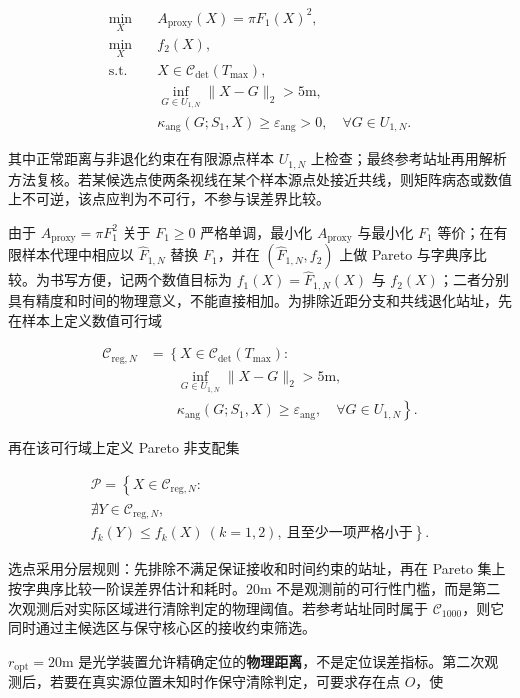 \[
\begin{aligned}
\min_{X}\quad
& A_{\mathrm{proxy}}(X)=\pi F_1(X)^2,\\
\min_{X}\quad
& f_2(X),\\
\text{s.t.}\quad
& X\in\mathcal C_{\det}(T_{\max}),\\
& \inf_{G\in U_{1,N}}\lVert X-G\rVert_2>5\mathrm{m},\\
& \kappa_{\mathrm{ang}}(G;S_1,X)\ge\varepsilon_{\mathrm{ang}}>0,
\quad \forall G\in U_{1,N}.
\end{aligned}
\]

其中正常距离与非退化约束在有限源点样本 $U_{1,N}$ 上检查；最终参考站址再用解析方法复核。若某候选点使两条视线在某个样本源点处接近共线，则矩阵病态或数值上不可逆，该点应判为不可行，不参与误差界比较。

由于 $A_{\mathrm{proxy}}=\pi F_1^2$ 关于 $F_1\ge0$ 严格单调，最小化 $A_{\mathrm{proxy}}$ 与最小化 $F_1$ 等价；在有限样本代理中相应以 $\widehat F_{1,N}$ 替换 $F_1$，并在 $(\widehat F_{1,N},f_2)$ 上做 Pareto 与字典序比较。为书写方便，记两个数值目标为 $f_1(X)=\widehat F_{1,N}(X)$ 与 $f_2(X)$；二者分别具有精度和时间的物理意义，不能直接相加。为排除近距分支和共线退化站址，先在样本上定义数值可行域

\[
\begin{aligned}
\mathcal C_{\mathrm{reg},N}
&=\left\{X\in\mathcal C_{\det}(T_{\max}):\right.\\
&\qquad\inf_{G\in U_{1,N}}\lVert X-G\rVert_2>5\mathrm{m},\\
&\qquad\left.\kappa_{\mathrm{ang}}(G;S_1,X)\ge\varepsilon_{\mathrm{ang}},\quad \forall G\in U_{1,N}\right\}.
\end{aligned}
\]


再在该可行域上定义 Pareto 非支配集

\[
\begin{gathered}
\mathcal P=
\left\{X\in\mathcal C_{\mathrm{reg},N}:\right.\\
\left.\nexists Y\in\mathcal C_{\mathrm{reg},N},\right.\\
\left.f_k(Y)\le f_k(X)\ (k=1,2),\ \text{且至少一项严格小于}\right\}.
\end{gathered}
\]

选点采用分层规则：先排除不满足保证接收和时间约束的站址，再在 Pareto 集上按字典序比较一阶误差界估计和耗时。$20\mathrm{m}$ 不是观测前的可行性门槛，而是第二次观测后对实际区域进行清除判定的物理阈值。若参考站址同时属于 $\mathcal C_{1000}$，则它同时通过主候选区与保守核心区的接收约束筛选。

$r_{\mathrm{opt}}=20\mathrm{m}$ 是光学装置允许精确定位的\textbf{物理距离}，不是定位误差指标。第二次观测后，若要在真实源位置未知时作保守清除判定，可要求存在点 $O$，使


